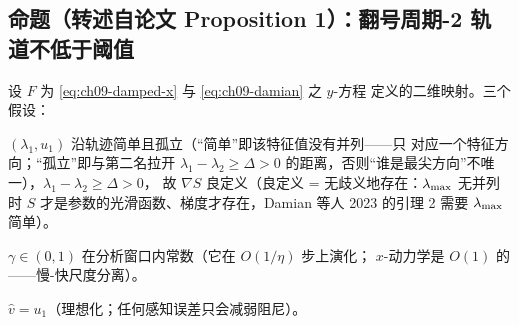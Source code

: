 \subsection{命题（转述自论文 Proposition 1）：翻号周期-2 轨道不低于阈值}\label{sec:ch09-prop}

设 $F$ 为 \eqref{eq:ch09-damped-x} 与 \eqref{eq:ch09-damian} 之 $y$-方程
定义的二维映射。三个假设：

\begin{assumption}[A1：非退化顶部对，转述]
$(\lambda_1,u_1)$ 沿轨迹简单且孤立（“简单”即该特征值没有并列——只
对应一个特征方向；“孤立”即与第二名拉开 $\lambda_1-\lambda_2\ge\Delta>0$
的距离，否则“谁是最尖方向”不唯一），$\lambda_1-\lambda_2\ge\Delta>0$，
故 $\nabla S$ 良定义（良定义 = 无歧义地存在：$\lambda_{\max}$ 无并列时 $S$
才是参数的光滑函数、梯度才存在，Damian 等人 2023 的引理 2 需要 $\lambda_{\max}$ 简单）。
\end{assumption}

\begin{assumption}[A2：窗口固定阻尼，转述]
$\gamma\in(0,1)$ 在分析窗口内常数（它在 $O(1/\eta)$ 步上演化；
$x$-动力学是 $O(1)$ 的——慢-快尺度分离）。
\end{assumption}

\begin{assumption}[A3：精确感知，转述]
$\hat v=u_1$（理想化；任何感知误差只会减弱阻尼）。
\end{assumption}

